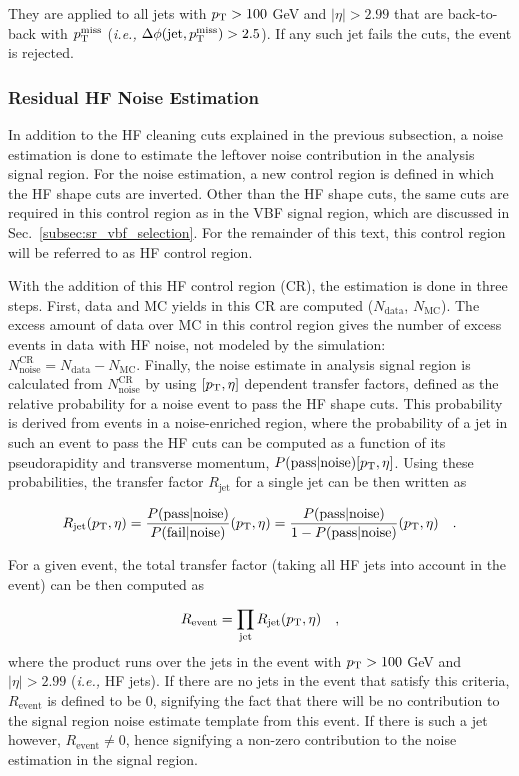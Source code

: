 They are applied to all jets with $p_{\textrm{T}} > 100$ GeV and $|\eta| > 2.99$ that are back-to-back with $p_{\textrm{T}}^{\textrm{miss}}$
(\textit{i.e.,} $\Delta\phi(\textrm{jet},p_{\textrm{T}}^{\textrm{miss}}) > 2.5$). If any such jet fails the cuts, the event is rejected. 


\subsubsection{Residual HF Noise Estimation}
\label{subsubsec:hf_noise_est}

In addition to the HF cleaning cuts explained in the previous subsection,
a noise estimation is done to estimate the leftover noise contribution in  
the analysis signal region. For the noise estimation, a new control region is defined
in which the HF shape cuts are inverted. Other than the HF shape cuts,
the same cuts are required in this control region as in the VBF signal region, which are
discussed in Sec.~\ref{subsec:sr_vbf_selection}. For the remainder of this text, this control
region will be referred to as HF control region.

With the addition of this HF control region (CR), the estimation is done in three steps.
First, data and MC yields in this CR are computed ($N_{\textrm{data}}$, $N_{\textrm{MC}}$). The excess amount of data over MC 
in this control region gives the number of excess events in data with HF noise, not modeled by the 
simulation: $N_{\textrm{noise}}^{\textrm{CR}} = N_{\textrm{data}} - N_{\textrm{MC}}$. 
Finally, the noise estimate in analysis signal region is calculated from $N_{\textrm{noise}}^{\textrm{CR}}$ by using $[p_{\textrm{T}}, \eta]$ dependent transfer factors,
defined as the relative probability for a noise event to pass the HF shape cuts.
This probability is derived from events in a noise-enriched region, where the probability of a jet in such an event
to pass the HF cuts can be computed as a function of its pseudorapidity and transverse momentum, $P( \text{pass} | \text{noise} )[p_{\textrm{T}}, \eta]$.
Using these probabilities, the transfer factor $R_{\textrm{jet}}$ for a single jet can be then written as

\begin{equation}
    R_{\textrm{jet}} (p_{\textrm{T}}, \eta) = \frac{P( \text{pass} | \text{noise} )}{P( \text{fail} | \text{noise} )} (p_{\textrm{T}}, \eta) = \frac{P( \text{pass} | \text{noise} )}{1 - P( \text{pass} | \text{noise} )} (p_{\textrm{T}}, \eta) \quad .
\end{equation}

For a given event, the total transfer factor (taking all HF jets into account in the event) can be then computed as

\begin{equation}
    R_{\textrm{event}} = \prod_{\textrm{jet}} R_{\textrm{jet}} (p_{\textrm{T}}, \eta) \quad ,
\end{equation}
where the product runs over the jets in the event with $p_{\textrm{T}} > 100$ GeV and $|\eta| > 2.99$ (\textit{i.e.,} HF jets). If there are no
jets in the event that satisfy this criteria, $R_{\textrm{event}}$ is defined to be $0$, signifying the fact that there will be no contribution
to the signal region noise estimate template from this event. If there is such a jet however, $R_{\textrm{event}} \neq 0$, hence signifying
a non-zero contribution to the noise estimation in the signal region.

